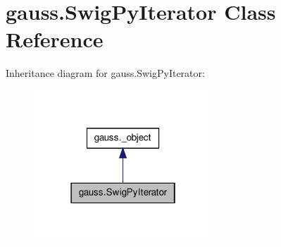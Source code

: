 \hypertarget{classgauss_1_1_swig_py_iterator}{\section{gauss.\-Swig\-Py\-Iterator Class Reference}
\label{classgauss_1_1_swig_py_iterator}
}


Inheritance diagram for gauss.\-Swig\-Py\-Iterator\-:\nopagebreak
\begin{figure}[H]
\begin{center}
\leavevmode
\includegraphics[width=190pt]{classgauss_1_1_swig_py_iterator__inherit__graph}
\end{center}
\end{figure}
